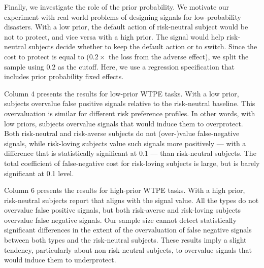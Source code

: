 \documentclass[12pt,a4paper]{article}
\begin{document}

Finally, we investigate the role of the prior probability. We motivate our experiment with real world problems of designing signals for low-probability disasters. With a low prior, the default action of risk-neutral subject would be not to protect, and vice versa with a high prior. The signal would help risk-neutral subjects decide whether to keep the default action or to switch. Since the cost to protect is equal to ($0.2 \times$ the loss from the adverse effect), we split the sample using $0.2$ as the cutoff. Here, we use a regression specification that includes prior probability fixed effects. 

Column 4 presents the results for low-prior WTPE tasks. With a low prior, subjects overvalue false positive signals relative to the risk-neutral baseline. This overvaluation is similar for different risk preference profiles. In other words, with low priors, subjects overvalue signals that would induce them to overprotect. Both risk-neutral and risk-averse subjects do not (over-)value false-negative signals, while risk-loving subjects value such signals more positively --- with a difference that is statistically significant at 0.1 --- than risk-neutral subjects. The total coefficient of false-negative cost for risk-loving subjects is large, but is barely significant at 0.1 level. 

Column 6 presents the results for high-prior WTPE tasks. With a high prior, risk-neutral subjects report that aligns with the signal value. All the types do not overvalue false positive signals, but both risk-averse and risk-loving subjects overvalue false negative signals. Our sample size cannot detect statistically significant differences in the extent of the overvaluation of false negative signals between both types and the risk-neutral subjects. These results imply a slight tendency, particularly about non-risk-neutral subjects, to overvalue signals that would induce them to underprotect.
\end{document}
